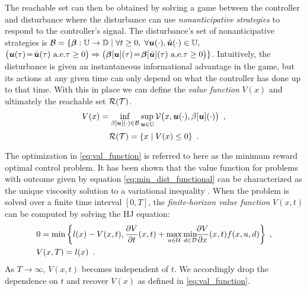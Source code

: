 

The reachable set can then be obtained by solving a game between the controller and disturbance where the disturbance can use \emph{nonanticipative strategies} to respond to the controller's signal. The disturbance's set of nonanticipative strategies is $\mathcal{B} = \{\bm{\beta}:\mathbb{U}\to\mathbb{D}\;|\;
\forall t\ge 0,\; \forall \bm{u}(\cdot),\hat{\bm{u}}(\cdot)\in\mathbb{U},$
${\big(\bm{u}(\tau) \!=\! \hat{\bm{u}}(\tau)\text{ a.e.} \tau\ge0\big)\Rightarrow
{\big(\bm{\beta}[\bm{u}](\tau) \!=\! \bm{\beta}[\hat{\bm{u}}](\tau)}{\text{ a.e.} \tau\ge0\big)}}\}$. Intuitively, the disturbance is given an instantaneous informational advantage in the game, but its actions at any given time can only depend on what the controller has done up to that time. With this in place we can define the \emph{value function} $V(x)$ and ultimately the reachable set $\mathcal{R}(\mathcal{T})$. 
%
\begin{equation} \label{eq:val_function}
V(x)=\inf_{\beta[\bm{u}](\cdot) \in \mathcal{B}} \sup_{\bm{u} \in \mathbb{U}}\mathcal{V}\big(x,\bm{u}(\cdot),\beta[\bm{u}](\cdot)\big) \enspace,
\end{equation}
%
\begin{equation} \label{eq:reach_set}
\mathcal{R}(\mathcal{T}) = \{x \mid V(x) \le 0\} \enspace.
\end{equation}  

The optimization in \eqref{eq:val_function} is referred to here as the minimum reward optimal control problem. It has been shown that the value function for problems with outcome given by equation \eqref{eq:min_dist_functional} can be characterized as the unique viscosity solution to a variational inequality \cite{Barron1990}. When the problem is solved over a finite time interval $[0,T]$, the \emph{finite-horizon value function} $V(x,t)$ can be computed by solving the HJ equation: 
%
\begin{equation} \label{eq:HJ_mr}
\begin{split} 
    & 0 = \min\left\{l(x)-V(x,t), \frac{\partial V}{\partial t}(x,t)+ \max_{u\in\mathcal{U}} \min_{ d\in\mathcal{D}} \!\!\frac{\partial V}{\partial x}(x,t) f(x,u, d)\right\} \;,\\
    &V(x,T) = l(x) \enspace.
\end{split}
\end{equation}
%
 As $T \rightarrow \infty$, $V(x,t)$ becomes independent of $t$. We accordingly drop the dependence on $t$ and recover $V(x)$ as defined in \eqref{eq:val_function}. 


